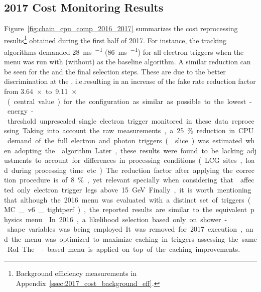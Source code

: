 \FloatBarrier
\subsection{2017 Cost Monitoring Results}\label{ssec:cpu_2017_estimations}

Figure~\ref{fig:chain_cpu_comp_2016_2017}
summarizes the cost reprocessing results\footnote{Background efficiency
measurements in Appendix~\ref{ssec:2017_cost_background_eff}.} obtained during
the first half of 2017. For instance, the tracking algorithms demanded
\SI{28}{\milli\second\per{}} (\SI{86}{\milli\second\per{}})
for all electron triggers when the menu was run with (without) \rnn{} as the
baseline algorithm. A similar reduction can be seen for the \hltcalo{} and the
final \hlt{} selection steps. These are due to the better \rnn{} discrimination
at the \fastcalo{}, i.e.\@ resulting in an increase of the fake rate reduction
factor from \SI{3.64}{$\times$} to \SI{9.11}{$\times$} (central value) for the
configuration as similar as possible to the lowest-energy-threshold unprescaled
single electron trigger monitored in these data reprocessing.

Taking into account the raw measurements, a \SI{25}{\%}
reduction in CPU demand of the full electron and photon triggers (\egamma{}
slice) was estimated when adopting the \rnn{} algorithm. Later, these results
were found to be lacking adjustments to account for differences in processing
conditions (LCG sites, load during processing time etc.). The reduction factor
after applying the correction procedure is of \SI{8}{\%}, yet relevant
specially when considering that \rnn{} affected only electron trigger legs above
\SI{15}{\GeV}.

Finally, it is worth mentioning that although the 2016 menu was evaluated with a
distinct set of triggers (MC\_v6\_tightperf), the reported results are similar
to the equivalent physics menu~\cite{RyanComment_ATR-15989}. In 2016, a
likelihood selection based only on shower-shape variables was being employed. It
was removed for 2017 execution, and the menu was optimized to maximize caching
in triggers assessing the same RoI. The \rnn-based menu is applied on top of the
caching improvements.

